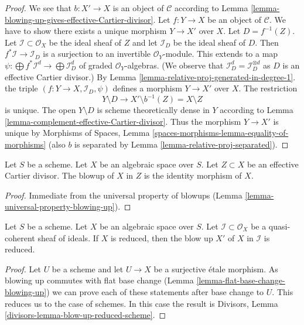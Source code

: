 \begin{proof}
We see that $b : X' \to X$ is an object of $\mathcal{C}$ according to
Lemma \ref{lemma-blowing-up-gives-effective-Cartier-divisor}.
Let $f : Y \to X$ be an object of $\mathcal{C}$. We have to show there exists
a unique morphism $Y \to X'$ over $X$. Let $D = f^{-1}(Z)$.
Let $\mathcal{I} \subset \mathcal{O}_X$ be the ideal sheaf of $Z$
and let $\mathcal{I}_D$ be the ideal sheaf of $D$. Then
$f^*\mathcal{I} \to \mathcal{I}_D$ is a surjection
to an invertible $\mathcal{O}_Y$-module. This extends to a map
$\psi : \bigoplus f^*\mathcal{I}^d \to \bigoplus \mathcal{I}_D^d$
of graded $\mathcal{O}_Y$-algebras. (We observe that
$\mathcal{I}_D^d = \mathcal{I}_D^{\otimes d}$ as $D$ is an
effective Cartier divisor.) By
Lemma \ref{lemma-relative-proj-generated-in-degree-1}.
the triple $(f : Y \to X, \mathcal{I}_D, \psi)$ defines a
morphism $Y \to X'$ over $X$. The restriction
$$
Y \setminus D \longrightarrow X' \setminus b^{-1}(Z) = X \setminus Z
$$
is unique. The open $Y \setminus D$ is scheme theoretically dense in $Y$
according to Lemma \ref{lemma-complement-effective-Cartier-divisor}. 
Thus the morphism $Y \to X'$ is unique by
Morphisms of Spaces, Lemma \ref{spaces-morphisms-lemma-equality-of-morphisms}
(also $b$ is separated by Lemma
\ref{lemma-relative-proj-separated}).
\end{proof}

\begin{lemma}
\label{lemma-blow-up-effective-Cartier-divisor}
Let $S$ be a scheme. Let $X$ be an algebraic space over $S$.
Let $Z \subset X$ be an effective Cartier divisor.
The blowup of $X$ in $Z$ is the identity morphism of $X$.
\end{lemma}

\begin{proof}
Immediate from the universal property of blowups
(Lemma \ref{lemma-universal-property-blowing-up}).
\end{proof}

\begin{lemma}
\label{lemma-blow-up-reduced-space}
Let $S$ be a scheme. Let $X$ be an algebraic space over $S$.
Let $\mathcal{I} \subset \mathcal{O}_X$ be a
quasi-coherent sheaf of ideals. If $X$ is reduced, then the
blow up $X'$ of $X$ in $\mathcal{I}$ is reduced.
\end{lemma}

\begin{proof}
Let $U$ be a scheme and let $U \to X$ be a surjective \'etale morphism.
As blowing up commutes with flat base change
(Lemma \ref{lemma-flat-base-change-blowing-up})
we can prove each of these statements after base change to $U$.
This reduces us to the case of schemes.
In this case the result is
Divisors, Lemma \ref{divisors-lemma-blow-up-reduced-scheme}.
\end{proof}

